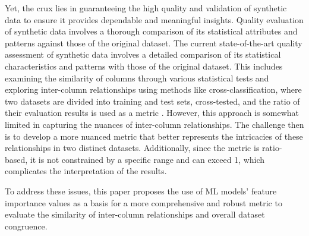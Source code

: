 Yet, the crux lies in guaranteeing the high quality and validation of synthetic data to ensure it provides dependable and meaningful insights. Quality evaluation of synthetic data involves a thorough comparison of its statistical attributes and patterns against those of the original dataset. The current state-of-the-art quality assessment of synthetic data involves a detailed comparison of its statistical characteristics and patterns with those of the original dataset. This includes examining the similarity of columns through various statistical tests and exploring inter-column relationships using methods like cross-classification, where two datasets are divided into training and test sets, cross-tested, and the ratio of their evaluation results is used as a metric \cite{mullerEvaluationSyntheticElectronic2022, goncalvesGenerationEvaluationSynthetic2020a}. However, this approach is somewhat limited in capturing the nuances of inter-column relationships. The challenge then is to develop a more nuanced metric that better represents the intricacies of these relationships in two distinct datasets. Additionally, since the metric is ratio-based, it is not constrained by a specific range and can exceed 1, which complicates the interpretation of the results. 

To address these issues, this paper proposes the use of ML models' feature importance values as a basis for a more comprehensive and robust metric to evaluate the similarity of inter-column relationships and overall dataset congruence.